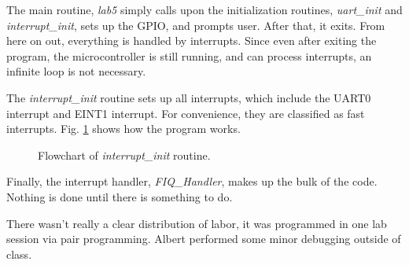 \documentclass[letterpaper,10pt]{article}
\begin{document}
    \clearpage

    The main routine, \textit{lab5} simply calls upon the initialization routines,
    \textit{uart\_init} and \textit{interrupt\_init}, sets up the GPIO, and
    prompts user. After that, it exits. From here on out, everything is handled
    by interrupts. Since even after exiting the program, the microcontroller is
    still running, and can process interrupts, an infinite loop is not necessary.

    \begin{minipage}{\linewidth}
        
        \label{flo:main}
    \end{minipage}

    The \textit{interrupt\_init} routine sets up all interrupts, which include
    the UART0 interrupt and EINT1 interrupt. For convenience, they are
    classified as fast interrupts. Fig. \ref{flo:interrupt_init} shows how the
    program works.

    \begin{figure}[p]
        
        \caption{Flowchart of \textit{interrupt\_init} routine.}
        \label{flo:interrupt_init}
    \end{figure}

    Finally, the interrupt handler, \textit{FIQ\_Handler}, makes up the bulk of
    the code. Nothing is done until there is something to do.

    \begin{minipage}{\linewidth}
        
        \label{flo:fiq_handler}
    \end{minipage}

    There wasn't really a clear distribution of labor, it was programmed in one
    lab session via pair programming. Albert performed some minor debugging
    outside of class.
\end{document}

